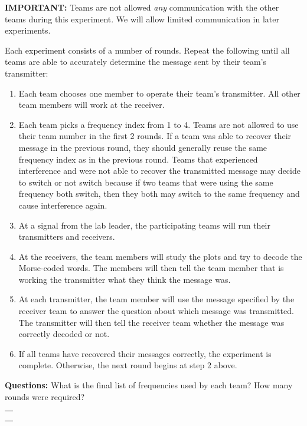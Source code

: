 \documentclass[11pt]{article}
\providecommand{\tightlist}{%
      \setlength{\itemsep}{0pt}\setlength{\parskip}{0pt}}
\begin{document}
\textbf{IMPORTANT:} Teams are not allowed \emph{any} communication with
the other teams during this experiment. We will allow limited
communication in later experiments.

Each experiment consists of a number of rounds. Repeat the following
until all teams are able to accurately determine the message sent by
their team's transmitter:

\begin{enumerate}
\def\labelenumi{\arabic{enumi}.}
\tightlist
\item
  Each team chooses one member to operate their team's transmitter. All
  other team members will work at the receiver.
\item
  Each team picks a frequency index from 1 to 4. Teams are not allowed
  to use their team number in the first 2 rounds. If a team was able to
  recover their message in the previous round, they should generally
  reuse the same frequency index as in the previous round. Teams that
  experienced interference and were not able to recover the transmitted
  message may decide to switch or not switch because if two teams that
  were using the same frequency both switch, then they both may switch
  to the same frequency and cause interference again.
\item
  At a signal from the lab leader, the participating teams will run
  their transmitters and receivers.
\item
  At the receivers, the team members will study the plots and try to
  decode the Morse-coded words. The members will then tell the team
  member that is working the transmitter what they think the message
  was.
\item
  At each transmitter, the team member will use the message specified by
  the receiver team to answer the question about which message was
  transmitted. The transmitter will then tell the receiver team whether
  the message was correctly decoded or not.
\item
  If all teams have recovered their messages correctly, the experiment
  is complete. Otherwise, the next round begins at step 2 above.
\end{enumerate}

\textbf{Questions:} What is the final list of frequencies used by each
team? How many rounds were required?

\begin{longtable}[]{@{}l@{}}
\toprule
 \\
\midrule
\endhead
 \\
 \\
 \\
\bottomrule
\end{longtable}
\end{document}
